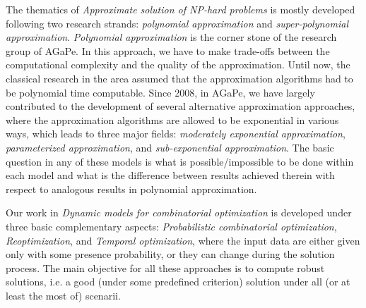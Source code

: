 The thematics of \textit{Approximate solution of NP-hard problems} is mostly developed following two research strands: \textit{polynomial approximation} and \textit{super-polynomial approximation}. \textit{Polynomial approximation} is the corner stone of the research group of AGaPe. In this approach, we have to make trade-offs between the computational complexity and the quality of the approximation.
Until now, the classical research in the area assumed that the approximation algorithms had to be polynomial time computable. Since 2008, in AGaPe, we have largely contributed to the development of several alternative approximation approaches, where the approximation algorithms are allowed to be exponential in various ways, which leads to three major fields: 
\textit{moderately exponential approximation}, \textit{parameterized approximation}, and \textit{sub-exponential approximation}. The basic question in any of these models is what is possible/impossible to be done within each model and what is the difference between results achieved therein with respect to analogous results in polynomial approximation.


Our work in \textit{Dynamic models for combinatorial optimization} is developed under three basic complementary aspects: \textit{Probabilistic combinatorial optimization}, \textit{Reoptimization}, and \textit{Temporal optimization}, where the input data are either given only with some presence probability, or they can change during the solution process. The main objective for all these approaches is to compute robust solutions, i.e. a good (under some predefined criterion) solution under all (or at least the most of) scenarii. 



